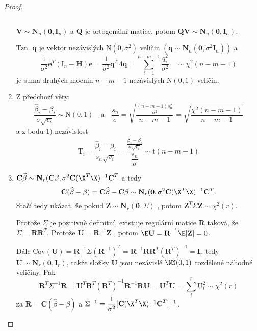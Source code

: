 \begin{proof}
\begin{enumerate}
$$$$
\begin{theorem}
	$ \textbf{V} \sim \textbf{N}_n ( \textbf{0} , \textbf{I}_n )  $ a $ \textbf{Q} $ je ortogonální matice, potom $ \textbf{QV} \sim \textbf{N}_n ( \textbf{0} , \textbf{I}_n ). $
\end{theorem}
Tzn. $ \textbf{q} $ je vektor nezávislých $ \text{N}(0,\sigma^{2}) $ veličin $ ( \textbf{q} \sim \textbf{N}_n ( \textbf{0} , \sigma^{2} \textbf{I}_n )) $ a
$$ \frac{1}{\sigma^{2}} \textbf{e}^{T} ( \text{I}_n - \textbf{H} ) \textbf{e} = \frac{1}{\sigma^{2}} \textbf{q}^{T} \Lambda \textbf{q} = \sum_{i = 1}^{n-m-1}\frac{q_i^{2}}{\sigma^{2}} \quad \sim \chi^{2} (n - m - 1 ) $$
je suma druhých mocnin $ n-m-1 $ nezávislých $ \text{N}(0,1) $ veličin.
\item Z předchozí věty:
$$
  \frac{\widehat{\beta}_i - \beta_i}{\sigma \sqrt{v_i}} \sim \text{N}(0,1) \quad \text{a} \quad \frac{s_n}{\sigma} = \sqrt{\frac{\frac{(n-m-1) s_n^{2}}{\sigma^{2}}}{n-m-1}} = \sqrt{\frac{\chi^{2}( n-m-1 )}{n-m-1}}
$$
a z bodu $ 1) $ nezávislost
$$
  \text{T}_i = \frac{\widehat{\beta}_i - \beta_i}{s_n \sqrt{v_i}} = \dfrac{\frac{\widehat{\beta}_i - \beta_i}{\sigma \sqrt{v_i}}}{\dfrac{s_n}{\sigma}} \sim \text{t}(n-m-1)
$$
\item
$ \textbf{C} \widehat{\beta} \sim \textbf{N}_r ( \textbf{C} \beta , \sigma^{2} \textbf{C} ( \X ^{T} \X )^{-1} \textbf{C}^{T} $ a tedy
$$ \textbf{C} ( \widehat{\beta} - \beta ) = \textbf{C}\widehat{\beta} - \textbf{C} \beta \sim \textbf{N}_r ( \textbf{0} , \sigma^{2} \textbf{C} ( \X ^{T} \X )^{-1} \textbf{C}^{T}. $$
Stačí tedy ukázat, že pokud $ \textbf{Z} \sim \textbf{N}_r ( \textbf{0}, \Sigma ) $ , potom $ \textbf{Z}^{T} \Sigma \textbf{Z} \sim \chi^{2}(r) $.

Protože $ \Sigma $ je pozitivně definitní, existuje regulární matice \textbf{R} taková, že $ \Sigma = \textbf{RR}^{T} $. Protože $ \textbf{U} = \textbf{R}^{-1} \textbf{Z} $ , potom $ \E \textbf{U} = \textbf{R}^{-1} \E [ \textbf{Z} ] = 0 $.

Dále $ \text{Cov}(\textbf{U}) = \textbf{R}^{-1} \Sigma (\textbf{R}^{-1} )^{T} = \textbf{R}^{-1} \textbf{RR}^{T} ( \textbf{R}^{T})^{-1} = \textbf{I}_r $ tedy $ \textbf{U} \sim \textbf{N}_r ( \textbf{0}, \textbf{I}_r ) $, takže složky \textbf{U} jsou nezávislé $\NN(0,1)$ rozdělené náhodné veličiny. Pak
$$ \textbf{R}^{T} \Sigma ^{-1} \textbf{R} = \textbf{U}^{T} \textbf{R}^{T} ( \textbf{R}^{T} )^{-1} \textbf{R}^{-1} \textbf{R} \textbf{U} = \textbf{U}^{T} \textbf{U} = \sum_i^{r} \text{U}_i^{2} \sim \chi^{2}(r) $$
za $ \textbf{R} = \textbf{C} ( \widehat{\beta} - \beta ) $ a $ \Sigma^{-1} = \dfrac{1}{\sigma^{2}} [ \textbf{C} ( \X ^{T} \X )^{-1} \textbf{C}^{T} ]^{-1}$.

\end{enumerate}
\end{proof}

